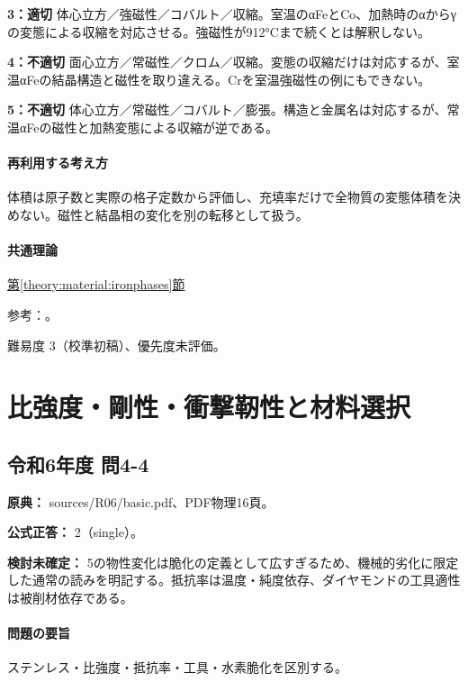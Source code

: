 \noindent\textbf{3：適切} 体心立方／強磁性／コバルト／収縮。室温のαFeとCo、加熱時のαからγの変態による収縮を対応させる。強磁性が912°Cまで続くとは解釈しない。\par

\noindent\textbf{4：不適切} 面心立方／常磁性／クロム／収縮。変態の収縮だけは対応するが、室温αFeの結晶構造と磁性を取り違える。Crを室温強磁性の例にもできない。\par

\noindent\textbf{5：不適切} 体心立方／常磁性／コバルト／膨張。構造と金属名は対応するが、常温αFeの磁性と加熱変態による収縮が逆である。\par

\paragraph{再利用する考え方} 体積は原子数と実際の格子定数から評価し、充填率だけで全物質の変態体積を決めない。磁性と結晶相の変化を別の転移として扱う。

\paragraph{共通理論} \hyperref[theory:material:ironphases]{第\ref*{theory:material:ironphases}節}

\par 参考：\cite{princeton_iron,iron_transform2023,openstax_magnetism,iron_curie1954}。

\par 難易度 3（校準初稿）、優先度未評価。

\section{比強度・剛性・衝撃靭性と材料選択}

\subsection{令和6年度 問4-4}
\label{q:r06-reg-basic-4-4}

\noindent\textbf{原典：} sources/R06/basic.pdf、PDF物理16頁。

\textbf{公式正答：} 2（single）。

\par\textbf{検討未確定：} 5の物性変化は脆化の定義として広すぎるため、機械的劣化に限定した通常の読みを明記する。抵抗率は温度・純度依存、ダイヤモンドの工具適性は被削材依存である。

\paragraph{問題の要旨} ステンレス・比強度・抵抗率・工具・水素脆化を区別する。


